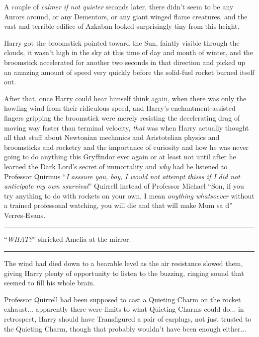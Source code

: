 A couple of \emph{calmer if not quieter} seconds later, there didn't seem to be any Aurors around, or any Dementors, or any giant winged flame creatures, and the vast and terrible edifice of Azkaban looked surprisingly tiny from this height.

Harry got the broomstick pointed toward the Sun, faintly visible through the clouds, it wasn't high in the sky at this time of day and month of winter, and the broomstick accelerated for another two seconds in that direction and picked up an amazing amount of speed very quickly before the solid-fuel rocket burned itself out.

After that, once Harry could hear himself think again, when there was only the howling wind from their ridiculous speed, and Harry's enchantment-assisted fingers gripping the broomstick were merely resisting the decelerating drag of moving way faster than terminal velocity, \emph{that} was when Harry actually thought all that stuff about Newtonian mechanics and Aristotelian physics and broomsticks and rocketry and the importance of curiosity and how he was never going to do anything this Gryffindor ever again or at least not until after he learned the Dark Lord's secret of immortality and \emph{why} had he listened to Professor Quirinus ``\emph{I asssure you, boy, I would not attempt thisss if I did not anticipate my own ssurvival}'' Quirrell instead of Professor Michael ``Son, if you try anything to do with rockets on your own, I mean \emph{anything whatsoever} without a trained professonal watching, you will die and that will make Mum sa d'' Verres-Evans.

\begin{center}\rule{3in}{0.4pt}\end{center}

``\emph{WHAT?}'' shrieked Amelia at the mirror.

\begin{center}\rule{3in}{0.4pt}\end{center}

The wind had died down to a bearable level as the air resistance slowed them, giving Harry plenty of opportunity to listen to the buzzing, ringing sound that seemed to fill his whole brain.

Professor Quirrell had been supposed to cast a Quieting Charm on the rocket exhaust... apparently there were limits to what Quieting Charms could do... in retrospect, Harry should have Transfigured a pair of earplugs, not just trusted to the Quieting Charm, though that probably wouldn't have been enough either...

